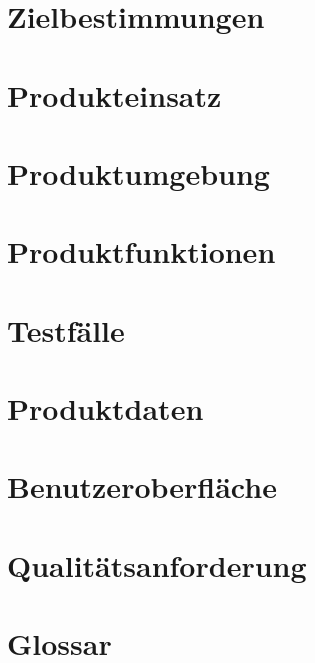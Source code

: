 \documentclass{report}
\begin{document}
	\chapter{Zielbestimmungen}\label{chp:zielbestimmungen}
	
	
	\chapter{Produkteinsatz}\label{chp:produkteinsatz}
	
		
	\chapter{Produktumgebung}\label{chp:produktumgebung}
	
	

	\chapter{Produktfunktionen}\label{chp:produktfunktionen}
	

	\chapter{Testfälle}\label{chp:testfaelle}
	
	
	\chapter{Produktdaten}\label{chp:produktdaten}
	
	
	\chapter{Benutzeroberfläche}\label{chp:benutzeroberflaeche}
	
	
	\chapter{Qualitätsanforderung}\label{chp:qualitaetsanforderung}
	
	
	\chapter{Glossar}\label{chp:glossar}
	
	
	
	
\end{document}
